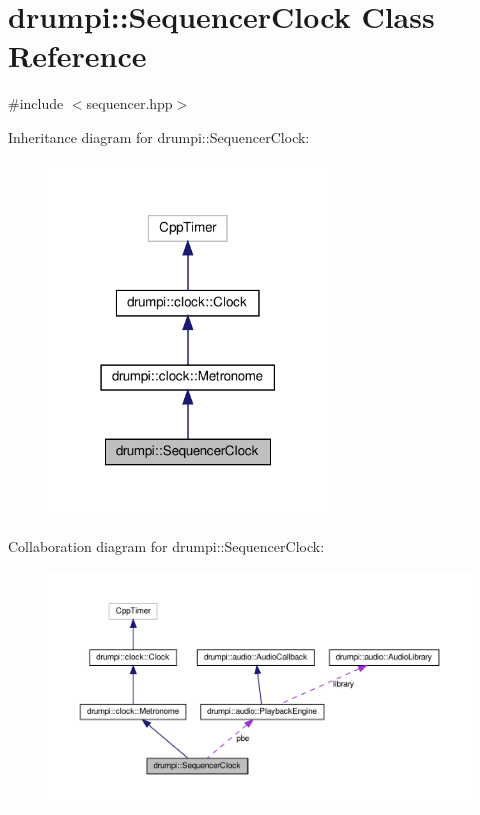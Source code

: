 \hypertarget{classdrumpi_1_1SequencerClock}{}\section{drumpi\+:\+:Sequencer\+Clock Class Reference}
\label{classdrumpi_1_1SequencerClock}


{\ttfamily \#include $<$sequencer.\+hpp$>$}



Inheritance diagram for drumpi\+:\+:Sequencer\+Clock\+:
\nopagebreak
\begin{figure}[H]
\begin{center}
\leavevmode
\includegraphics[width=210pt]{classdrumpi_1_1SequencerClock__inherit__graph}
\end{center}
\end{figure}


Collaboration diagram for drumpi\+:\+:Sequencer\+Clock\+:
\nopagebreak
\begin{figure}[H]
\begin{center}
\leavevmode
\includegraphics[width=350pt]{classdrumpi_1_1SequencerClock__coll__graph}
\end{center}
\end{figure}
